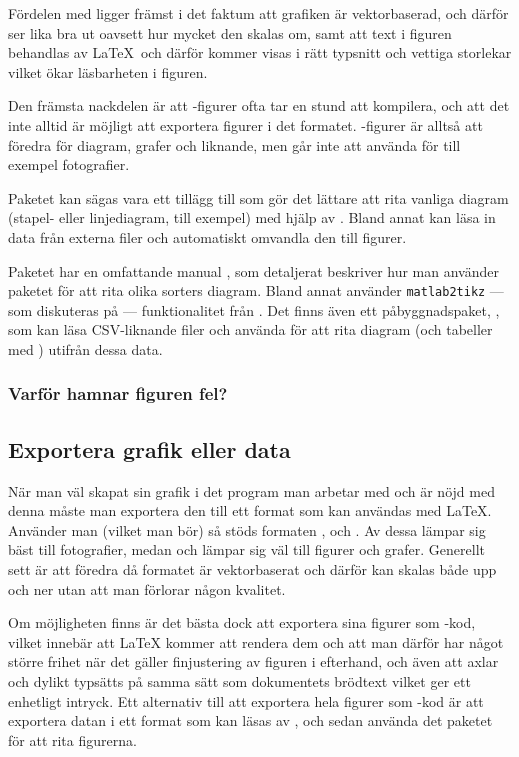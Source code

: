 \documentclass[lang=sv,ptsize=10pt,font=none,nomath,titles=bf,../../a4.tex]{subfiles}
\begin{document}
Fördelen med \PGFTikZ ligger främst i det faktum att grafiken är
vektorbaserad, och därför ser lika bra ut oavsett hur mycket den skalas
om, samt att text i figuren behandlas av \LaTeX\ och därför kommer visas
i rätt typsnitt och vettiga storlekar vilket ökar läsbarheten i figuren.

Den främsta nackdelen är att \PGFTikZ-figurer ofta tar en stund att
kompilera, och att det inte alltid är möjligt att exportera figurer
i det formatet. \PGFTikZ-figurer är alltså att föredra för diagram,
grafer och liknande, men går inte att använda för till exempel
fotografier.

Paketet  kan sägas vara ett tillägg till \PGFTikZ som gör
det lättare att rita vanliga diagram (stapel- eller linjediagram, till
exempel) med hjälp av \PGFTikZ. Bland annat kan  läsa in
data från externa filer och automatiskt omvandla den till figurer.

Paketet har en omfattande manual \parencite{Feuersanger13a}, som
detaljerat beskriver hur man använder paketet för att rita olika
sorters diagram.
Bland annat använder \texttt{matlab2tikz} — som diskuteras på
 — funktionalitet från .
Det finns även ett påbyggnadspaket, 
\parencite{Feuersanger13b}, som kan läsa
CSV-liknande filer och använda  för att rita diagram
(och tabeller med ) utifrån dessa data.

\subsubsection{Varför hamnar figuren fel?}

\subsection{Exportera grafik eller data}
När man väl skapat sin grafik i det program man arbetar med och är nöjd
med denna måste man exportera den till ett format som kan användas med
\LaTeX. Använder man \pdfLaTeX (vilket man bör) så stöds formaten \JPEG,
\PNG och \PDF. Av dessa lämpar sig \JPEG bäst till fotografier, medan
\PNG och \PDF lämpar sig väl till figurer och grafer.
Generellt sett är \PDF att föredra då formatet är vektorbaserat och
därför kan skalas både upp och ner utan att man förlorar någon kvalitet.

Om möjligheten finns är det bästa dock att exportera sina figurer som
\PGFTikZ-kod, vilket innebär att \LaTeX{} kommer att rendera dem och att
man därför har något större frihet när det gäller finjustering av figuren
i efterhand, och även att axlar och dylikt typsätts på samma sätt som
dokumentets brödtext vilket ger ett enhetligt intryck. Ett alternativ
till att exportera hela figurer som \PGFTikZ-kod är att exportera datan
i ett format som kan läsas av , och sedan använda det
paketet för att rita figurerna.
\end{document}
